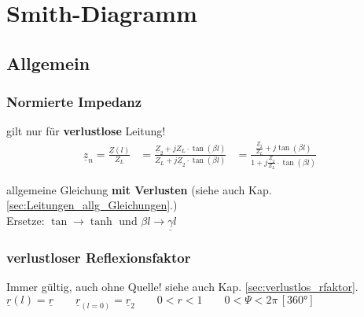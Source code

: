 \section{Smith-Diagramm}

\subsection{Allgemein} \label{sec:Smith_All}


%
%
%

\subsubsection{Normierte Impedanz}
gilt nur für \textbf{verlustlose} Leitung!
\begin{align*}
	\underline{z}_n= \frac{\underline{Z}(l)}{Z_L} &= \frac{\underline{Z}_2+jZ_L\cdot\tan(\beta l)}{Z_L+j\underline{Z}_2\cdot\tan(\beta l)}
	&= \frac{\frac{\underline{Z}_2}{Z_L}+j \tan(\beta l)}{1+j\frac{\underline{Z}_2}{Z_L}\cdot\tan(\beta l)}&
\end{align*}

allgemeine Gleichung \textbf{mit Verlusten} (siehe auch Kap. \ref{sec:Leitungen_allg_Gleichungen}.)\\
Ersetze: \quad $\tan \rightarrow \tanh$ und $\beta l \rightarrow \underline{\gamma} l$
\subsubsection{verlustloser Reflexionsfaktor}\label{sec:verlustlos_rfaktor_smith}
Immer gültig, auch ohne Quelle! \qquad siehe auch Kap. \ref{sec:verlustlos_rfaktor}.\\
$ \underline{r}(l) = \underline{r} \qquad \underline{r}_{(l=0)} = \underline{r}_2 \qquad 0<r<1 \qquad 0<\Psi<2\pi \, [\ang{360}] $\\

